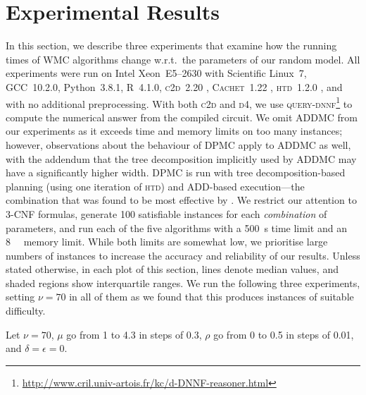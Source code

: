 
\section{Experimental Results}\label{sec:experiments}

In this section, we describe three experiments that examine how the running
times of WMC algorithms change w.r.t.\ the parameters of our random model. All
experiments were run on Intel Xeon~E5--2630 with Scientific Linux~7, GCC~10.2.0,
Python~3.8.1, R~4.1.0, \textsc{c2d}~2.20 \citep{DBLP:conf/ecai/Darwiche04},
\textsc{Cachet}~1.22 \citep{DBLP:conf/sat/SangBBKP04}, \textsc{htd}~1.2.0
\citep{DBLP:conf/cpaior/AbseherMW17}, and with no additional preprocessing. With
both \textsc{c2d} and \textsc{d4}, we use
\textsc{query-dnnf}\footnote{\url{http://www.cril.univ-artois.fr/kc/d-DNNF-reasoner.html}}
to compute the numerical answer from the compiled circuit. We omit
\textsc{ADDMC} \citep{DBLP:conf/aaai/DudekPV20} from our experiments as it
exceeds time and memory limits on too many instances; however, observations
about the behaviour of \textsc{DPMC} \citep{DBLP:conf/cp/DudekPV20} apply to
\textsc{ADDMC} as well, with the addendum that the tree decomposition implicitly
used by \textsc{ADDMC} may have a significantly higher width. \textsc{DPMC} is
run with tree decomposition-based planning (using one iteration of \textsc{htd})
and ADD-based execution---the combination that was found to be most effective by
\citet{DBLP:conf/cp/DudekPV20}. We restrict our attention to 3-CNF formulas,
generate 100 satisfiable instances for each \emph{combination} of parameters,
and run each of the five algorithms with a \SI{500}{\second} time limit and an
\SI{8}{\gibi\byte} memory limit. While both limits are somewhat low, we
prioritise large numbers of instances to increase the accuracy and reliability
of our results. Unless stated otherwise, in each plot of this section, lines
denote median values, and shaded regions show interquartile ranges. We run the
following three experiments, setting $\nu = 70$ in all of them as we found that
this produces instances of suitable difficulty.

\begin{experiment}\label{exp:density}
  Let $\nu = 70$, $\mu$ go from 1 to 4.3 in steps of 0.3, $\rho$ go from 0 to
  0.5 in steps of 0.01, and $\delta = \epsilon = 0$.
\end{experiment}

